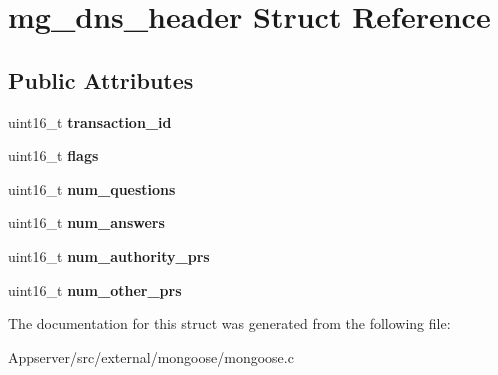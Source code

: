 \hypertarget{structmg__dns__header}{}\section{mg\+\_\+dns\+\_\+header Struct Reference}
\label{structmg__dns__header}
\subsection*{Public Attributes}
\begin{DoxyCompactItemize}
\item 
uint16\+\_\+t {\bfseries transaction\+\_\+id}\hypertarget{structmg__dns__header_a00963ebb1d83de6f48f7733679c4b8a7}{}\label{structmg__dns__header_a00963ebb1d83de6f48f7733679c4b8a7}

\item 
uint16\+\_\+t {\bfseries flags}\hypertarget{structmg__dns__header_a42a3a0530dcceaa67b96f054c1c44aa6}{}\label{structmg__dns__header_a42a3a0530dcceaa67b96f054c1c44aa6}

\item 
uint16\+\_\+t {\bfseries num\+\_\+questions}\hypertarget{structmg__dns__header_a156d3f5926d1fdb24bcbcba1f273c59a}{}\label{structmg__dns__header_a156d3f5926d1fdb24bcbcba1f273c59a}

\item 
uint16\+\_\+t {\bfseries num\+\_\+answers}\hypertarget{structmg__dns__header_a2d577357775702ca340492ca51379b21}{}\label{structmg__dns__header_a2d577357775702ca340492ca51379b21}

\item 
uint16\+\_\+t {\bfseries num\+\_\+authority\+\_\+prs}\hypertarget{structmg__dns__header_a90a7621286acf1c8b78d3ee450dce9b6}{}\label{structmg__dns__header_a90a7621286acf1c8b78d3ee450dce9b6}

\item 
uint16\+\_\+t {\bfseries num\+\_\+other\+\_\+prs}\hypertarget{structmg__dns__header_aed8714aa60f2cc79dc0c81378c2ddb50}{}\label{structmg__dns__header_aed8714aa60f2cc79dc0c81378c2ddb50}

\end{DoxyCompactItemize}


The documentation for this struct was generated from the following file\+:\begin{DoxyCompactItemize}
\item 
Appserver/src/external/mongoose/mongoose.\+c\end{DoxyCompactItemize}
